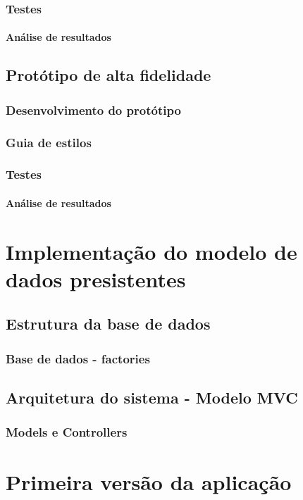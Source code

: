 \documentclass[11pt, twoside]{report}
\begin{document}
	\subsection{Testes}
	\subsubsection{Análise de resultados}
	
	\section{Protótipo de alta fidelidade}
	\subsection{Desenvolvimento do protótipo}
	\subsection{Guia de estilos}
	\subsection{Testes}
	\subsubsection{Análise de resultados}
	
	\chapter{Implementação do modelo de dados presistentes}
	\section{Estrutura da base de dados}
	\subsection{Base de dados - factories}
	\section{Arquitetura do sistema - Modelo MVC}
	\subsection{Models e Controllers}
	
	\chapter{Primeira versão da aplicação}
\end{document}
